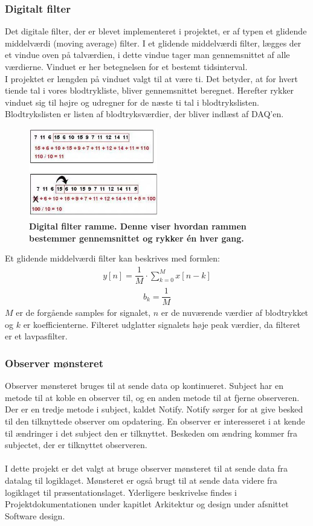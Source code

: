 \subsubsection{Digitalt filter}
Det digitale filter, der er blevet implementeret i projektet, er af typen et glidende middelværdi (moving average) filter. I et glidende middelværdi filter, lægges der et vindue oven på talværdien, i dette vindue tager man gennemsnittet af alle værdierne. \cite{digifilter} Vinduet er her betegnelsen for et bestemt tidsinterval. \\
I projektet er længden på vinduet valgt til at være ti. Det betyder, at for hvert tiende tal i vores blodtrykliste, bliver gennemsnittet beregnet. Herefter rykker vinduet sig til højre og udregner for de næste ti tal i blodtrykslisten. Blodtrykslisten er listen af blodtryksværdier, der bliver indlæst af DAQ’en. 
\begin{figure}[H]
\includegraphics[width =0.5\textwidth , center]{billeder/RammeDigi}
\caption{\textbf{Digital filter ramme. Denne viser hvordan rammen bestemmer gennemsnittet og rykker én hver gang.}}
\end{figure}
Et glidende middelværdi filter kan beskrives med formlen:
\begin{align}
y\left[n\right] = \dfrac{1}{M}\cdot \sum_{k=0}^{M}x\left[n-k\right]
\end{align}
\begin{align}
b_{k}=\dfrac{1}{M}
\end{align}
$M$ er de forgående samples for signalet, $n$ er de nuværende værdier af blodtrykket og $k$ er koefficienterne. 
Filteret udglatter signalets høje peak værdier, da filteret er et lavpasfilter.
\subsubsection{Observer mønsteret}
Observer mønsteret bruges til at sende data op kontinueret. Subject har en metode til at koble en observer til, og en anden metode til at fjerne observeren. Der er en tredje metode i subject, kaldet Notify. Notify sørger for at give besked til den tilknyttede observer om opdatering. En observer er interesseret i at kende til ændringer i det subject den er tilknyttet. Beskeden om ændring kommer fra subjectet, der er tilknyttet observeren. \\
\\
I dette projekt er det valgt at bruge observer mønsteret til at sende data fra datalag til logiklaget. Mønsteret er også brugt til at sende data videre fra logiklaget til præsentationslaget. Yderligere beskrivelse findes i Projektdokumentationen under kapitlet Arkitektur og design under afsnittet Software design. 
